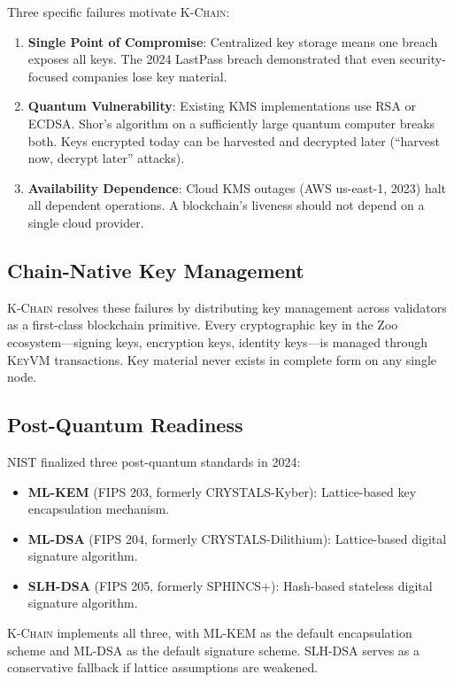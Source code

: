 \documentclass[11pt,letterpaper]{article}
\theoremstyle{definition}
\theoremstyle{remark}
\newcommand{\KChain}{\textsc{K-Chain}}
\newcommand{\KeyVM}{\textsc{KeyVM}}
\begin{document}
Three specific failures motivate \KChain{}:

\begin{enumerate}
\item \textbf{Single Point of Compromise}: Centralized key storage means one breach exposes all keys. The 2024 LastPass breach demonstrated that even security-focused companies lose key material.
\item \textbf{Quantum Vulnerability}: Existing KMS implementations use RSA or ECDSA. Shor's algorithm on a sufficiently large quantum computer breaks both. Keys encrypted today can be harvested and decrypted later (``harvest now, decrypt later'' attacks).
\item \textbf{Availability Dependence}: Cloud KMS outages (AWS us-east-1, 2023) halt all dependent operations. A blockchain's liveness should not depend on a single cloud provider.
\end{enumerate}

\subsection{Chain-Native Key Management}

\KChain{} resolves these failures by distributing key management across validators as a first-class blockchain primitive. Every cryptographic key in the Zoo ecosystem---signing keys, encryption keys, identity keys---is managed through \KeyVM{} transactions. Key material never exists in complete form on any single node.

\subsection{Post-Quantum Readiness}

NIST finalized three post-quantum standards in 2024:

\begin{itemize}
\item \textbf{ML-KEM} (FIPS 203, formerly CRYSTALS-Kyber): Lattice-based key encapsulation mechanism.
\item \textbf{ML-DSA} (FIPS 204, formerly CRYSTALS-Dilithium): Lattice-based digital signature algorithm.
\item \textbf{SLH-DSA} (FIPS 205, formerly SPHINCS+): Hash-based stateless digital signature algorithm.
\end{itemize}

\KChain{} implements all three, with ML-KEM as the default encapsulation scheme and ML-DSA as the default signature scheme. SLH-DSA serves as a conservative fallback if lattice assumptions are weakened.
\end{document}
